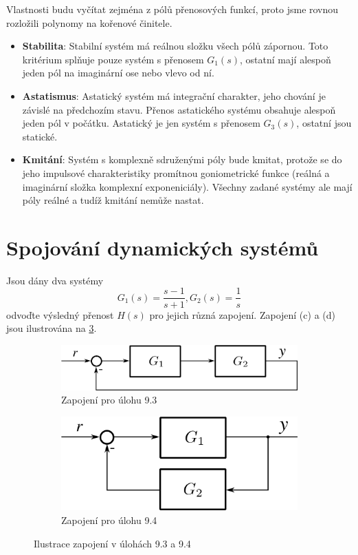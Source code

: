 \documentclass[twoside]{article}
\begin{document}
Vlastnosti budu vyčítat zejména z pólů přenosových funkcí, proto jsme rovnou rozložili polynomy na kořenové činitele.

\begin{itemize}
	\item \textbf{Stabilita}: Stabilní systém má reálnou složku všech pólů zápornou. Toto kritérium splňuje pouze systém s přenosem $G_1(s)$,
	ostatní mají alespoň jeden pól na imaginární ose nebo vlevo od ní.
	\item \textbf{Astatismus}: Astatický systém má integrační charakter, jeho chování je závislé na předchozím stavu. Přenos astatického 
	systému obsahuje alespoň jeden pól v počátku. Astatický je jen systém s přenosem $G_3(s)$, ostatní jsou statické.
	\item \textbf{Kmitání}: Systém s komplexně sdruženými póly bude kmitat, protože se do jeho impulsové charakteristiky promítnou goniometrické funkce
	(reálná a imaginární složka komplexní exponeniciály). Všechny zadané systémy ale mají póly reálné a tudíž kmitání nemůže nastat.
\end{itemize}






















\section{Spojování dynamických systémů}
\label{sec:ukol9}
Jsou dány dva systémy
\begin{equation*}
	G_1(s) = \frac{s-1}{s+1}, G_2(s) = \frac{1}{s}
\end{equation*}
odvoďte výsledný přenost $H(s)$ pro jejich různá zapojení. Zapojení (c) a (d) jsou ilustrována na \ref{fig:zapojeni}.
\begin{figure}[htbp]
	\centering
	\begin{subfigure}{0.45\textwidth}	
		\includegraphics[width=.45\textwidth]{zadani9-3.png}
		\caption{Zapojení pro úlohu 9.3}
		\label{fig:zadani9-3}
	\end{subfigure}
	\begin{subfigure}{0.45\textwidth}
		\centering
		\includegraphics[width=.45\textwidth]{zadani9-4.png}
		\caption{Zapojení pro úlohu 9.4}
		\label{fig:zadani9-4}
	\end{subfigure}
	\caption{Ilustrace zapojení v úlohách 9.3 a 9.4}
	\label{fig:zapojeni}
\end{figure}
\end{document}
